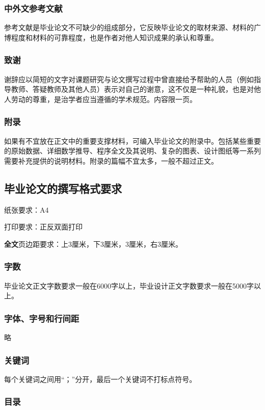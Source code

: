 \subsubsection{中外文参考文献}
参考文献是毕业论文不可缺少的组成部分，它反映毕业论文的取材来源、材料的广博程度和材料的可靠程度，也是作者对他人知识成果的承认和尊重。

\subsubsection{致谢}
谢辞应以简短的文字对课题研究与论文撰写过程中曾直接给予帮助的人员（例如指导教师、答疑教师及其他人员）表示对自己的谢意，这不仅是一种礼貌，也是对他人劳动的尊重，是治学者应当遵循的学术规范。内容限一页。

\subsubsection{附录}
如果有不宜放在正文中的重要支撑材料，可编入毕业论文的附录中。包括某些重要的原始数据、详细数学推导、程序全文及其说明、复杂的图表、设计图纸等一系列需要补充提供的说明材料。附录的篇幅不宜太多，一般不超过正文。

\subsection{毕业论文的撰写格式要求}

纸张要求：A4

打印要求：正反双面打印

\textbf{全文}页边距要求：上3厘米，下3厘米，3厘米，右3厘米。

\subsubsection{字数}
毕业论文正文字数要求一般在6000字以上，毕业设计正文字数要求一般在5000字以上。

\subsubsection{字体、字号和行间距}
略

\subsubsection{关键词}
每个关键词之间用“；”分开，最后一个关键词不打标点符号。

\subsubsection{目录}

